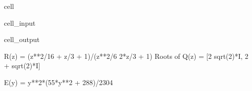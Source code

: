 \documentclass[letterpaper,10pt,english]{jupyterBook}
\begin{document}
\begin{sphinxuseclass}{cell}
\begin{sphinxVerbatimInput}
\begin{sphinxuseclass}{cell_input}
\begin{sphinxVerbatim}[commandchars=\\\{\}]
    

                
\end{sphinxVerbatim}

\end{sphinxuseclass}\end{sphinxVerbatimInput}
\begin{sphinxVerbatimOutput}

\begin{sphinxuseclass}{cell_output}
\begin{sphinxVerbatim}[commandchars=\\\{\}]
R(z) = (z**2/16 + z/3 + 1)/(z**2/6 \PYGZhy{} 2*z/3 + 1)
Roots of Q(z) = [2 \PYGZhy{} sqrt(2)*I, 2 + sqrt(2)*I]
\end{sphinxVerbatim}

\begin{sphinxVerbatim}[commandchars=\\\{\}]
E(y) = y**2*(55*y**2 + 288)/2304
\end{sphinxVerbatim}

\end{sphinxuseclass}\end{sphinxVerbatimOutput}

\end{sphinxuseclass}
\sphinxstepscope
\end{document}
